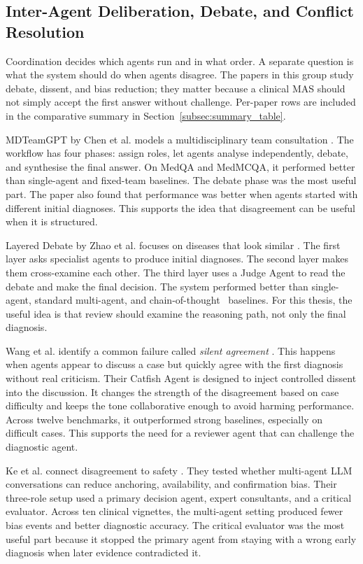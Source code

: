 \FloatBarrier
\subsection{Inter-Agent Deliberation, Debate, and Conflict Resolution}
\label{subsec:deliberation}

Coordination decides which agents run and in what order. A separate
question is what the system should do when agents disagree. The
papers in this group study debate, dissent, and bias reduction; they
matter because a clinical MAS should not simply accept the first
answer without challenge. Per-paper rows are included in the
comparative summary in Section~\ref{subsec:summary_table}.

MDTeamGPT by Chen et al. models a multidisciplinary team consultation
\cite{Chen2025MDTeamGPT}. The workflow has four phases: assign roles, let agents
analyse independently, debate, and synthesise the final answer. On MedQA and
MedMCQA, it performed better than single-agent and fixed-team baselines. The
debate phase was the most useful part. The paper also found that performance was
better when agents started with different initial diagnoses. This supports the
idea that disagreement can be useful when it is structured.

Layered Debate by Zhao et al. focuses on diseases that look similar
\cite{Zhao2025LayeredDebate}. The first layer asks specialist agents to produce
initial diagnoses. The second layer makes them cross-examine each other. The
third layer uses a Judge Agent to read the debate and make the final decision.
The system performed better than single-agent, standard multi-agent, and
chain-of-thought~\cite{Wei2022CoT} baselines. For this thesis, the useful
idea is that review
should examine the reasoning path, not only the final diagnosis.

Wang et al. identify a common failure called \textit{silent agreement}
\cite{Wang2025Catfish}. This happens when agents appear to discuss a case but
quickly agree with the first diagnosis without real criticism. Their Catfish
Agent is designed to inject controlled dissent into the discussion. It changes
the strength of the disagreement based on case difficulty and keeps the tone
collaborative enough to avoid harming performance. Across twelve benchmarks, it
outperformed strong baselines, especially on difficult cases. This supports the
need for a reviewer agent that can challenge the diagnostic agent.

Ke et al. connect disagreement to safety \cite{Ke2024CognitiveBias}. They tested
whether multi-agent LLM conversations can reduce anchoring, availability, and
confirmation bias. Their three-role setup used a primary decision agent, expert
consultants, and a critical evaluator. Across ten clinical vignettes, the
multi-agent setting produced fewer bias events and better diagnostic accuracy.
The critical evaluator was the most useful part because it stopped the primary
agent from staying with a wrong early diagnosis when later evidence contradicted
it.
